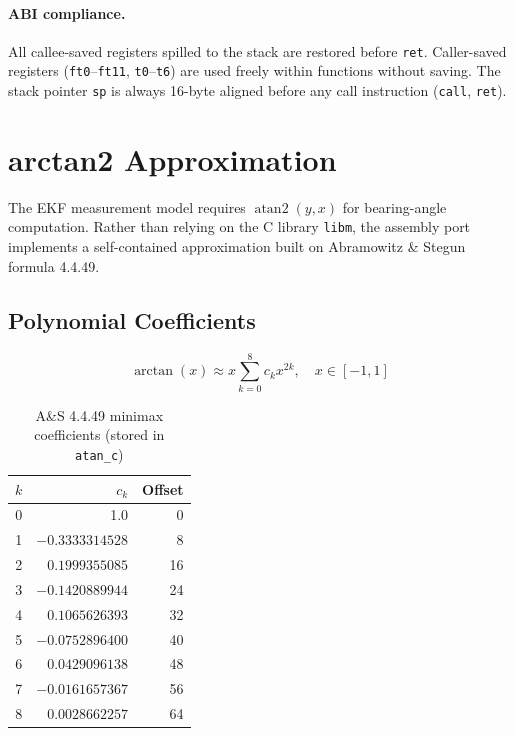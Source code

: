 \documentclass[12pt,a4paper]{article}
\newcommand{\reg}[1]{\texttt{\color{reg}#1}}
\newcommand{\insn}[1]{\texttt{\color{keyword}#1}}
\begin{document}
\paragraph{ABI compliance.}
All callee-saved registers spilled to the stack are restored before
\insn{ret}. Caller-saved registers (\reg{ft0}--\reg{ft11},
\reg{t0}--\reg{t6}) are used freely within functions without saving.
The stack pointer \reg{sp} is always 16-byte aligned before any call
instruction (\texttt{call}, \texttt{ret}).

\section{arctan2 Approximation}
\label{sec:atan2}

The EKF measurement model requires $\operatorname{atan2}(y,x)$ for
bearing-angle computation. Rather than relying on the C library
\texttt{libm}, the assembly port implements a self-contained
approximation built on Abramowitz \& Stegun formula 4.4.49.

\subsection{Polynomial Coefficients}

\[
  \arctan(x) \approx x \sum_{k=0}^{8} c_k x^{2k}, \quad x \in [-1,1]
\]

\begin{table}[H]
\centering
\caption{A\&S 4.4.49 minimax coefficients (stored in \texttt{atan\_c})}
\begin{tabular}{rrr}
\toprule
$k$ & $c_k$ & Offset \\
\midrule
0 &  1.0              & 0  \\
1 & $-0.3333314528$   & 8  \\
2 &  $0.1999355085$   & 16 \\
3 & $-0.1420889944$   & 24 \\
4 &  $0.1065626393$   & 32 \\
5 & $-0.0752896400$   & 40 \\
6 &  $0.0429096138$   & 48 \\
7 & $-0.0161657367$   & 56 \\
8 &  $0.0028662257$   & 64 \\
\bottomrule
\end{tabular}
\end{table}
\end{document}
